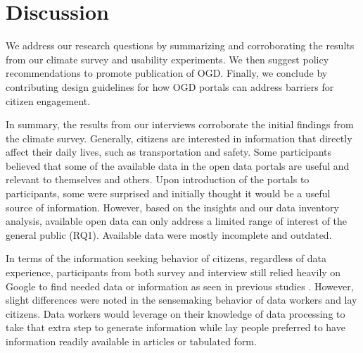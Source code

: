 \documentclass{sigchi}
\begin{document}

\section{Discussion}
We address our research questions by summarizing and corroborating the results from our climate survey and usability experiments. We then suggest policy recommendations to promote publication of OGD. Finally, we conclude by contributing design guidelines for how OGD portals can address barriers for citizen engagement. 

In summary, the results from our interviews corroborate the initial findings from the climate survey. Generally, citizens are interested in information that directly affect their daily lives, such as transportation and safety. Some participants believed that some of the available data in the open data portals are useful and relevant to themselves and others. Upon introduction of the portals to participants, some were surprised and initially thought it would be a useful source of information. However, based on the insights and our data inventory analysis, available open data can only address a limited range of interest of the general public (RQ1). Available data were mostly incomplete and outdated. 

In terms of the information seeking behavior of citizens, regardless of data experience, participants from both survey and interview still relied heavily on Google to find needed data or information as seen in previous studies \cite{Koesten2017}. However, slight differences were noted in the sensemaking behavior of data workers and lay citizens. Data workers would leverage on their knowledge of data processing to take that extra step to generate information while lay people preferred to have information readily available in articles or tabulated form. 
\end{document}
